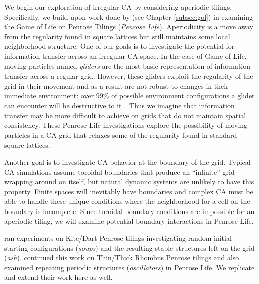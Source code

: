\documentclass[a4paper,11pt]{report}
\begin{document}
We begin our exploration of irregular CA by considering aperiodic tilings. Specifically, we build upon work done by \citeauthor{hi05} (see Chapter \ref{subsec:gol}) in examining the Game of Life on Penrose Tilings (\textit{Penrose Life}). Aperiodicity is a move away from the regularity found in square lattices but still maintains some local neighborhood structure. 
One of our goals is to investigate the potential for information transfer across an irregular CA space. In the case of Game of Life, moving particles named \textit{gliders} are the most basic representation of information transfer across a regular grid. However, these gliders exploit the regularity of the grid in their movement and as a result are not robust to changes in their immediate environment: over 99\% of possible environment configurations a glider can encounter will be destructive to it~\cite{be14}. Thus we imagine that information transfer may be more difficult to achieve on grids that do not maintain spatial consistency. These Penrose Life investigations explore the possibility of moving particles in a CA grid that relaxes some of the regularity found in standard square lattices.     

Another goal is to investigate CA behavior at the boundary of the grid. Typical CA simulations assume toroidal boundaries that produce an ``infinite'' grid wrapping around on itself, but natural dynamic systems are unlikely to have this property. Finite spaces will inevitably have boundaries and complex CA must be able to handle these unique conditions where the neighborhood for a cell on the boundary is incomplete. Since toroidal boundary conditions are impossible for an aperiodic tiling, we will examine potential boundary interactions in Penrose Life.


\citeauthor{hi05} ran experiments on Kite/Dart Penrose tilings investigating random initial starting configurations (\textit{soups}) and the resulting stable structures left on the grid (\textit{ash}). \citeauthor{ow10} continued this work on Thin/Thick Rhombus Penrose tilings and also examined repeating periodic structures (\textit{oscillators}) in Penrose Life. We replicate and extend their work here as well.
\end{document}
